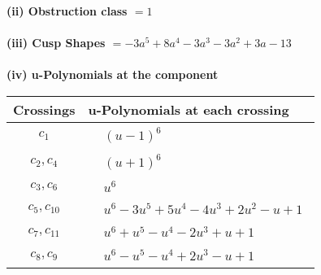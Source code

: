 \documentclass[1p]{elsarticle_modified}
\theoremstyle{definition}
\begin{document}
\flushleft \textbf{(ii) Obstruction class $= 1$}\\~\\
\flushleft \textbf{(iii) Cusp Shapes $= -3 a^5+8 a^4-3 a^3-3 a^2+3 a-13$}\\~\\
\newpage\renewcommand{\arraystretch}{1}
\flushleft \textbf{(iv) u-Polynomials at the component}\newline \\
\begin{tabular}{m{50pt}|m{274pt}}
Crossings & \hspace{64pt}u-Polynomials at each crossing \\
\hline $$\begin{aligned}c_{1}\end{aligned}$$&$\begin{aligned}
&(u-1)^6
\end{aligned}$\\
\hline $$\begin{aligned}c_{2},c_{4}\end{aligned}$$&$\begin{aligned}
&(u+1)^6
\end{aligned}$\\
\hline $$\begin{aligned}c_{3},c_{6}\end{aligned}$$&$\begin{aligned}
&u^6
\end{aligned}$\\
\hline $$\begin{aligned}c_{5},c_{10}\end{aligned}$$&$\begin{aligned}
&u^6-3 u^5+5 u^4-4 u^3+2 u^2- u+1
\end{aligned}$\\
\hline $$\begin{aligned}c_{7},c_{11}\end{aligned}$$&$\begin{aligned}
&u^6+u^5- u^4-2 u^3+u+1
\end{aligned}$\\
\hline $$\begin{aligned}c_{8},c_{9}\end{aligned}$$&$\begin{aligned}
&u^6- u^5- u^4+2 u^3- u+1
\end{aligned}$\\
\hline
\end{tabular}\\~\\
\end{document}
